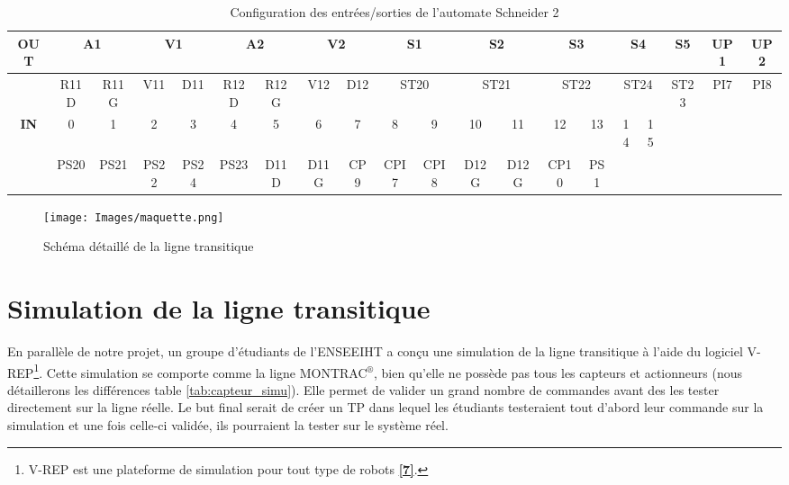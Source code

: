 \documentclass[a4paper,french, titlepage]{book}
\begin{document}
\begin{center}
{\begin{minipage}{1.5\linewidth}
\begin{table}[H]
	\begin{center}
		\begin{tabular}{|c|c|c|c|c|c|c|c|c|c|c|c|c|c|c|c|c|c|c|c|c|c|c|c|}
			\hline \multicolumn{2}{|c|}{\textbf{OUT}}  & \multicolumn{2}{|c|}{A1} & \multicolumn{2}{|c|}{V1} & \multicolumn{2}{|c|}{A2} & \multicolumn{2}{|c|}{V2} & \multicolumn{2}{|c|}{S1} & \multicolumn{2}{|c|}{S2} & \multicolumn{2}{|c|}{S3} & \multicolumn{2}{|c|}{S4} & \multicolumn{2}{|c|}{S5} & \multicolumn{2}{|c|}{UP1} & \multicolumn{2}{|c|}{UP2}  \\
			\hline \multicolumn{2}{|c|}{} & R11D & R11G & V11 & D11 & R12D & R12G & V12 & D12 & \multicolumn{2}{|c|}{ST20} & \multicolumn{2}{|c|}{ST21} & \multicolumn{2}{|c|}{ST22} & \multicolumn{2}{|c|}{ST24} & \multicolumn{2}{|c|}{ST23} & \multicolumn{2}{|c|}{PI7} & \multicolumn{2}{|c|}{PI8} \\
			\hline \multicolumn{2}{|c|}{\textbf{IN}} & 0 & 1 & 2 & 3 & 4 & 5 & 6 & 7 & 8 & 9 & 10 & 11 & 12 & 13 & 14 & 15 & & & & & & \\
			\hline \multicolumn{2}{|c|}{} & PS20 & PS21 & PS22 & PS24 & PS23 & D11D & D11G & CP9 & CPI7 & CPI8 & D12G & D12G & CP10 & PS1 & & & & & & & & \\
			\hline
		\end{tabular}      
	\end{center}
	\caption{\label{tab:ap2}Configuration des entrées/sorties de l'automate Schneider 2}
\end{table}
\end{minipage}
}%
\end{center}



\begin{figure}[H]
	     \begin{center}
	     \texttt{[image: Images/maquette.png]} 
	     \end{center}
	     \caption{Schéma détaillé de la ligne transitique}
	     \label{Schema_detaille}
\end{figure}

\section{Simulation de la ligne transitique} 

En parallèle de notre projet, un groupe d'étudiants de l'ENSEEIHT a conçu une simulation de la ligne transitique à l'aide du logiciel V-REP\footnote{V-REP est une plateforme de simulation pour tout type de robots \hyperref[biblio]{\textbf{[7]}}.}. Cette simulation se comporte comme la ligne MONTRAC$^{\circledR}$, bien qu'elle ne possède pas tous les capteurs et actionneurs (nous détaillerons les différences table \ref{tab:capteur_simu}). Elle permet de valider un grand nombre de commandes avant des les tester directement sur la ligne réelle. Le but final serait de créer un TP dans lequel les étudiants testeraient tout d'abord leur commande sur la simulation et une fois celle-ci validée, ils pourraient la tester sur le système réel.
\end{document}
